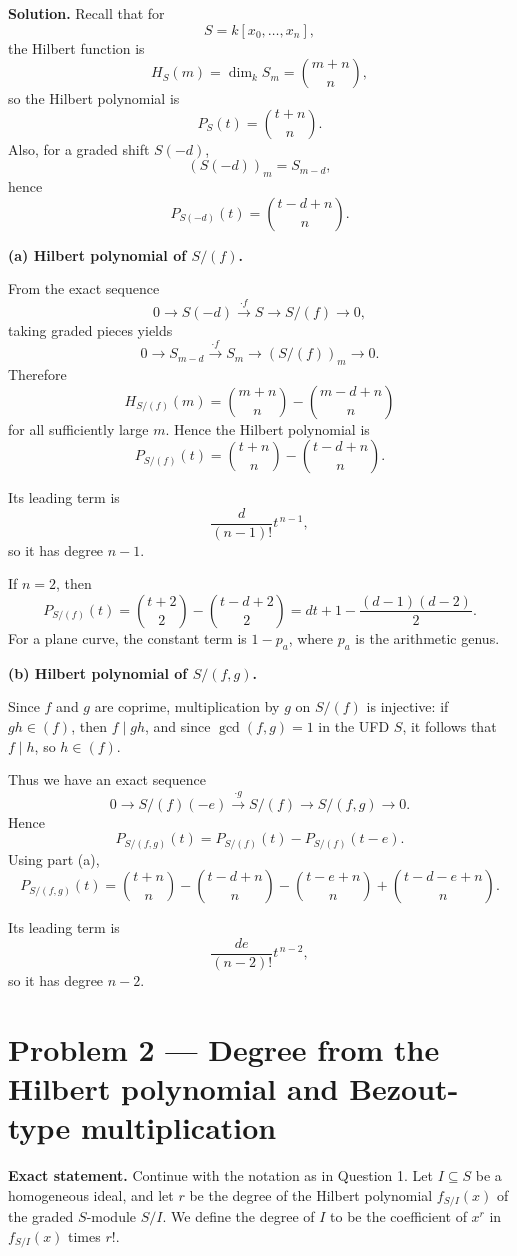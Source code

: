 \documentclass[12pt,a4paper]{article}
\theoremstyle{plain}
\theoremstyle{definition}      %
\begin{document}
	\textbf{Solution.}
	Recall that for
	\[
	S=k[x_0,\dots,x_n],
	\]
	the Hilbert function is
	\[
	H_S(m)=\dim_k S_m=\binom{m+n}{n},
	\]
	so the Hilbert polynomial is
	\[
	P_S(t)=\binom{t+n}{n}.
	\]
	Also, for a graded shift \(S(-d)\),
	\[
	(S(-d))_m=S_{m-d},
	\]
	hence
	\[
	P_{S(-d)}(t)=\binom{t-d+n}{n}.
	\]
	
	\medskip
	
	\textbf{(a) Hilbert polynomial of \(S/(f)\).}
	
	From the exact sequence
	\[
	0 \longrightarrow S(-d) \xrightarrow{\cdot f} S \longrightarrow S/(f) \longrightarrow 0,
	\]
	taking graded pieces yields
	\[
	0 \longrightarrow S_{m-d} \xrightarrow{\cdot f} S_m \longrightarrow (S/(f))_m \longrightarrow 0.
	\]
	Therefore
	\[
	H_{S/(f)}(m)=\binom{m+n}{n}-\binom{m-d+n}{n}
	\]
	for all sufficiently large \(m\). Hence the Hilbert polynomial is
	\[
	P_{S/(f)}(t)=\binom{t+n}{n}-\binom{t-d+n}{n}.
	\]
	
	Its leading term is
	\[
	\frac{d}{(n-1)!}t^{\,n-1},
	\]
	so it has degree \(n-1\).
	
	If \(n=2\), then
	\[
	P_{S/(f)}(t)=\binom{t+2}{2}-\binom{t-d+2}{2}
	=dt+1-\frac{(d-1)(d-2)}{2}.
	\]
	For a plane curve, the constant term is \(1-p_a\), where \(p_a\) is the arithmetic genus.
	
	\medskip
	
	\textbf{(b) Hilbert polynomial of \(S/(f,g)\).}
	
	Since \(f\) and \(g\) are coprime, multiplication by \(g\) on \(S/(f)\) is injective: if \(gh\in (f)\), then \(f\mid gh\), and since \(\gcd(f,g)=1\) in the UFD \(S\), it follows that \(f\mid h\), so \(h\in (f)\).
	
	Thus we have an exact sequence
	\[
	0\longrightarrow S/(f)(-e)\xrightarrow{\cdot g} S/(f)\longrightarrow S/(f,g)\longrightarrow 0.
	\]
	Hence
	\[
	P_{S/(f,g)}(t)=P_{S/(f)}(t)-P_{S/(f)}(t-e).
	\]
	Using part (a),
	\[
	P_{S/(f,g)}(t)
	=
	\binom{t+n}{n}
	-\binom{t-d+n}{n}
	-\binom{t-e+n}{n}
	+\binom{t-d-e+n}{n}.
	\]
	
	Its leading term is
	\[
	\frac{de}{(n-2)!}t^{\,n-2},
	\]
	so it has degree \(n-2\).
	
	\bigskip
	
	\section*{Problem 2 --- Degree from the Hilbert polynomial and Bezout-type multiplication}
	
	\textbf{Exact statement.}
	Continue with the notation as in Question 1. Let \(I\subseteq S\) be a homogeneous ideal, and let \(r\) be the degree of the Hilbert polynomial \(f_{S/I}(x)\) of the graded \(S\)-module \(S/I\). We define the degree of \(I\) to be the coefficient of \(x^r\) in \(f_{S/I}(x)\) times \(r!\).
	
\end{document}
